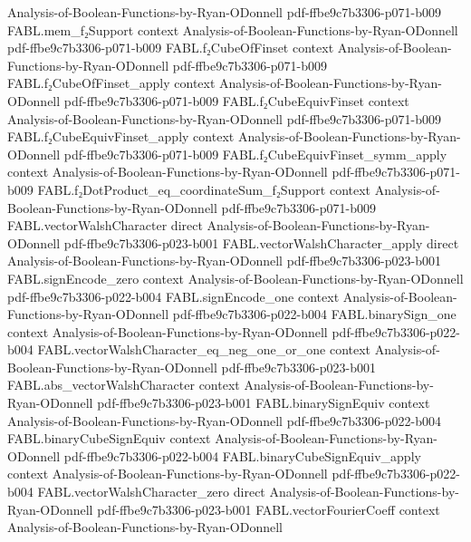 \begin{theorem}
  {Analysis-of-Boolean-Functions-by-Ryan-ODonnell}
  {pdf-ffbe9c7b3306-p071-b009}
\proofstep
  {FABL.mem_f₂Support}
  {context}
  {Analysis-of-Boolean-Functions-by-Ryan-ODonnell}
  {pdf-ffbe9c7b3306-p071-b009}
\proofstep
  {FABL.f₂CubeOfFinset}
  {context}
  {Analysis-of-Boolean-Functions-by-Ryan-ODonnell}
  {pdf-ffbe9c7b3306-p071-b009}
\proofstep
  {FABL.f₂CubeOfFinset_apply}
  {context}
  {Analysis-of-Boolean-Functions-by-Ryan-ODonnell}
  {pdf-ffbe9c7b3306-p071-b009}
\proofstep
  {FABL.f₂CubeEquivFinset}
  {context}
  {Analysis-of-Boolean-Functions-by-Ryan-ODonnell}
  {pdf-ffbe9c7b3306-p071-b009}
\proofstep
  {FABL.f₂CubeEquivFinset_apply}
  {context}
  {Analysis-of-Boolean-Functions-by-Ryan-ODonnell}
  {pdf-ffbe9c7b3306-p071-b009}
\proofstep
  {FABL.f₂CubeEquivFinset_symm_apply}
  {context}
  {Analysis-of-Boolean-Functions-by-Ryan-ODonnell}
  {pdf-ffbe9c7b3306-p071-b009}
\proofstep
  {FABL.f₂DotProduct_eq_coordinateSum_f₂Support}
  {context}
  {Analysis-of-Boolean-Functions-by-Ryan-ODonnell}
  {pdf-ffbe9c7b3306-p071-b009}
\proofstep
  {FABL.vectorWalshCharacter}
  {direct}
  {Analysis-of-Boolean-Functions-by-Ryan-ODonnell}
  {pdf-ffbe9c7b3306-p023-b001}
\proofstep
  {FABL.vectorWalshCharacter_apply}
  {direct}
  {Analysis-of-Boolean-Functions-by-Ryan-ODonnell}
  {pdf-ffbe9c7b3306-p023-b001}
\proofstep
  {FABL.signEncode_zero}
  {context}
  {Analysis-of-Boolean-Functions-by-Ryan-ODonnell}
  {pdf-ffbe9c7b3306-p022-b004}
\proofstep
  {FABL.signEncode_one}
  {context}
  {Analysis-of-Boolean-Functions-by-Ryan-ODonnell}
  {pdf-ffbe9c7b3306-p022-b004}
\proofstep
  {FABL.binarySign_one}
  {context}
  {Analysis-of-Boolean-Functions-by-Ryan-ODonnell}
  {pdf-ffbe9c7b3306-p022-b004}
\proofstep
  {FABL.vectorWalshCharacter_eq_neg_one_or_one}
  {context}
  {Analysis-of-Boolean-Functions-by-Ryan-ODonnell}
  {pdf-ffbe9c7b3306-p023-b001}
\proofstep
  {FABL.abs_vectorWalshCharacter}
  {context}
  {Analysis-of-Boolean-Functions-by-Ryan-ODonnell}
  {pdf-ffbe9c7b3306-p023-b001}
\proofstep
  {FABL.binarySignEquiv}
  {context}
  {Analysis-of-Boolean-Functions-by-Ryan-ODonnell}
  {pdf-ffbe9c7b3306-p022-b004}
\proofstep
  {FABL.binaryCubeSignEquiv}
  {context}
  {Analysis-of-Boolean-Functions-by-Ryan-ODonnell}
  {pdf-ffbe9c7b3306-p022-b004}
\proofstep
  {FABL.binaryCubeSignEquiv_apply}
  {context}
  {Analysis-of-Boolean-Functions-by-Ryan-ODonnell}
  {pdf-ffbe9c7b3306-p022-b004}
\proofstep
  {FABL.vectorWalshCharacter_zero}
  {direct}
  {Analysis-of-Boolean-Functions-by-Ryan-ODonnell}
  {pdf-ffbe9c7b3306-p023-b001}
\proofstep
  {FABL.vectorFourierCoeff}
  {context}
  {Analysis-of-Boolean-Functions-by-Ryan-ODonnell}

\end{theorem}

